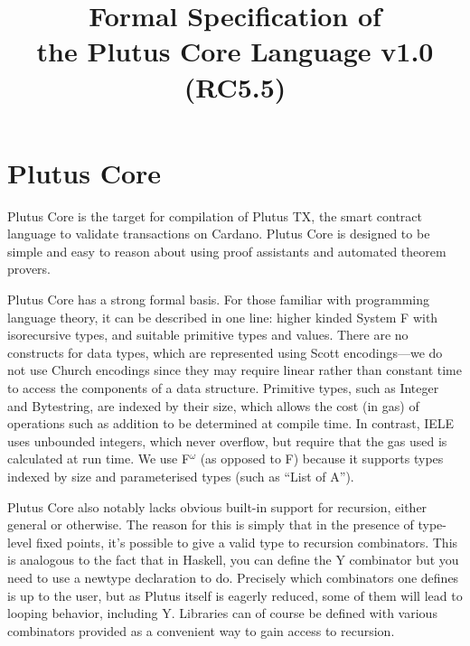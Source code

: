 \documentclass[a4paper]{article}
\newcommand{\Fomega}{F$^{\omega}$}
\begin{document}
%
\title{Formal Specification of\\the Plutus Core Language v1.0 (RC5.5)}


\maketitle

\thispagestyle{plain}
\pagestyle{plain}



\section{Plutus Core}

Plutus Core is the target for compilation of Plutus TX, the smart
contract language to validate transactions on Cardano. Plutus Core is
designed to be simple and easy to reason about using proof assistants
and automated theorem provers.

Plutus Core has a strong formal basis. For those familiar with
programming language theory, it can be described in one line: higher
kinded System F with isorecursive types, and suitable
primitive types and values. There are no constructs for data types,
which are represented using Scott encodings---we do not use Church
encodings since they may require linear rather than constant time to
access the components of a data structure. Primitive types, such as
Integer and Bytestring, are indexed by their size, which allows the
cost (in gas) of operations such as addition to be determined at
compile time. In contrast, IELE uses unbounded integers, which never
overflow, but require that the gas used is calculated at run time. We
use \Fomega{} (as opposed to F) because it supports types indexed by
size and parameterised types (such as ``List of A'').

Plutus Core also notably lacks obvious built-in support for recursion,
either general or otherwise. The reason for this is simply that in
the presence of type-level fixed points, it's possible to give a valid
type to recursion combinators. This is analogous to the fact that in
Haskell, you can define the Y combinator but you need to use a newtype
declaration to do. Precisely which combinators one defines is up to
the user, but as Plutus itself is eagerly reduced, some of them will
lead to looping behavior, including Y. Libraries can of course
be defined with various combinators provided as a convenient way to
gain access to recursion.
\end{document}
